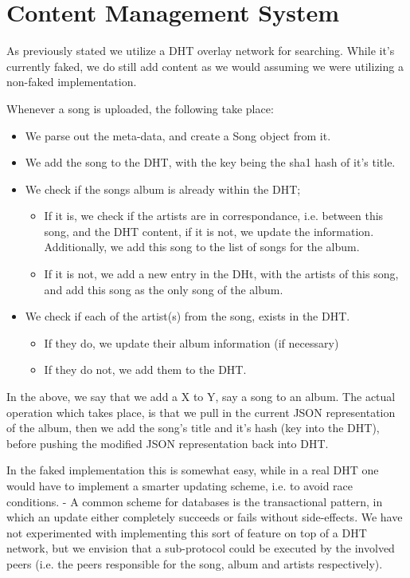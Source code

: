 \section{Content Management System}
As previously stated we utilize a \acs{DHT} overlay network for searching. While it's
currently faked, we do still add content as we would assuming we were utilizing
a non-faked implementation.

Whenever a song is uploaded, the following take place:
\begin{itemize}
\item We parse out the meta-data, and create a Song object from it.
\item We add the song to the \acs{DHT}, with the key being the sha1 hash of it's title.
\item We check if the songs album is already within the \acs{DHT};
\begin{itemize}
\item If it is, we check if the artists are in correspondance, i.e. between
    this song, and the \acs{DHT} content, if it is not, we update the information.
    Additionally, we add this song to the list of songs for the album.
\item If it is not, we add a new entry in the DHt, with the artists of this
    song, and add this song as the only song of the album.
\end{itemize}
\item We check if each of the artist(s) from the song, exists in the \acs{DHT}.
\begin{itemize}
\item If they do, we update their album information (if necessary)
\item If they do not, we add them to the \acs{DHT}.
\end{itemize}
\end{itemize}
In the above, we say that we add a X to Y, say a song to an album. The actual 
operation which takes place, is that we pull in the current \acs{JSON} representation
of the album, then we add the song's title and it's hash (key into the \acs{DHT}),
before pushing the modified \acs{JSON} representation back into \acs{DHT}.

In the faked implementation this is somewhat easy, while in a real \acs{DHT} one
would have to implement a smarter updating scheme, i.e. to avoid race conditions.
\newline
- A common scheme for databases is the transactional pattern, in which an update
either completely succeeds or fails without side-effects. We have not experimented
with implementing this sort of feature on top of a \acs{DHT} network, but we envision
that a sub-protocol could be executed by the involved peers (i.e. the peers
responsible for the song, album and artists respectively).

